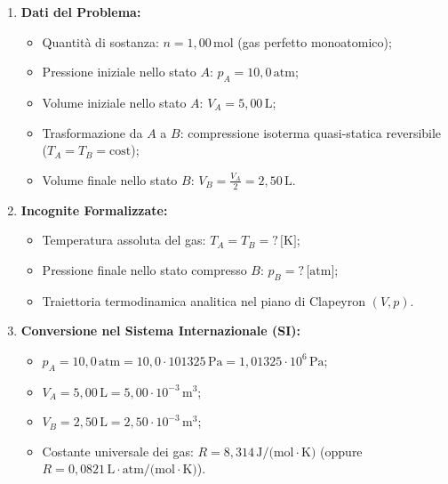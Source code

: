 \documentclass[11pt,a4paper,oneside]{report}
\begin{document}
\begin{problema}
\begin{enumerate}[label=\textbf{Fase \arabic*:}, leftmargin=*, itemsep=5pt]
  \item \textbf{Dati del Problema:}
  \begin{itemize}[leftmargin=*, label=\textbullet]
    \item Quantit\`a di sostanza: $n = 1{,}00\,\text{mol}$ (gas perfetto monoatomico);
    \item Pressione iniziale nello stato $A$: $p_A = 10{,}0\,\text{atm}$;
    \item Volume iniziale nello stato $A$: $V_A = 5{,}00\,\text{L}$;
    \item Trasformazione da $A$ a $B$: compressione isoterma quasi-statica reversibile ($T_A = T_B = \text{cost}$);
    \item Volume finale nello stato $B$: $V_B = \frac{V_A}{2} = 2{,}50\,\text{L}$.
  \end{itemize}

  \item \textbf{Incognite Formalizzate:}
  \begin{itemize}[leftmargin=*, label=\textbullet]
    \item Temperatura assoluta del gas: $T_A = T_B = ?\,\text{[K]}$;
    \item Pressione finale nello stato compresso $B$: $p_B = ?\,\text{[atm]}$;
    \item Traiettoria termodinamica analitica nel piano di Clapeyron $(V, p)$.
  \end{itemize}

  \item \textbf{Conversione nel Sistema Internazionale (SI):}
  \begin{itemize}[leftmargin=*, label=\textbullet]
    \item $p_A = 10{,}0\,\text{atm} = 10{,}0 \cdot 101325\,\text{Pa} = 1{,}01325 \cdot 10^6\,\text{Pa}$;
    \item $V_A = 5{,}00\,\text{L} = 5{,}00 \cdot 10^{-3}\,\text{m}^3$;
    \item $V_B = 2{,}50\,\text{L} = 2{,}50 \cdot 10^{-3}\,\text{m}^3$;
    \item Costante universale dei gas: $R = 8{,}314\,\text{J/(mol}\cdot\text{K)}$ (oppure $R = 0{,}0821\,\text{L}\cdot\text{atm/(mol}\cdot\text{K)}$).
  \end{itemize}


\end{enumerate}
\end{problema}
\end{document}
